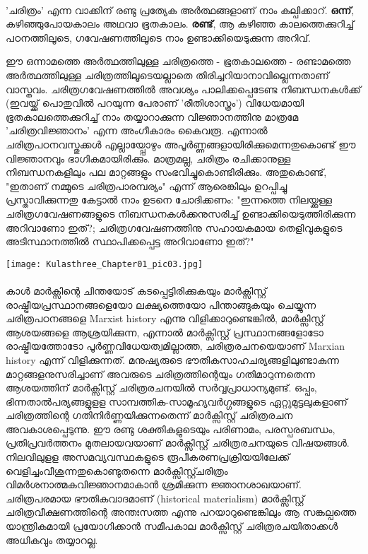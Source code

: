 \paragraph{}	'ചരിത്രം' എന്ന വാക്കിന് രണ്ടു പ്രത്യേക അർത്ഥങ്ങളാണ് നാം കല്പിക്കാറ്.
\noindent
\textbf{ഒന്ന്}, കഴിഞ്ഞുപോയകാലം അഥവാ ഭൂതകാലം.
\noindent
\textbf{രണ്ട്}, ആ കഴിഞ്ഞ കാലത്തെക്കുറിച്ച് പഠനത്തിലൂടെ, ഗവേഷണത്തിലൂടെ നാം ഉണ്ടാക്കിയെടുക്കുന്ന അറിവ്. 

	ഈ ഒന്നാമത്തെ അർത്ഥത്തിലുള്ള ചരിത്രത്തെ - ഭൂതകാലത്തെ - രണ്ടാമത്തെ അർത്ഥത്തിലുള്ള ചരിത്രത്തിലൂടെയല്ലാതെ തിരിച്ചറിയാനാവില്ലെന്നതാണ് വാസ്തവം. ചരിത്രഗവേഷണത്തിൽ അവശ്യം പാലിക്കപ്പെടേണ്ട നിബന്ധനകൾക്ക് (ഇവയ്ക്ക് പൊതുവിൽ പറയുന്ന പേരാണ് 'രീതിശാസ്ത്രം') വിധേയമായി ഭൂതകാലത്തെക്കുറിച്ച് നാം തയ്യാറാക്കുന്ന വിജ്ഞാനത്തിനു മാത്രമേ 'ചരിത്രവിജ്ഞാനം' എന്ന അംഗീകാരം കൈവരൂ. എന്നാൽ ചരിത്രപഠനവസ്തുക്കൾ എല്ലായ്പ്പോഴും അപൂർണ്ണങ്ങളായിരിക്കുമെന്നതുകൊണ്ട് ഈ വിജ്ഞാനവും ഭാഗികമായിരിക്കും. മാത്രമല്ല, ചരിത്രം രചിക്കാനുള്ള നിബന്ധനകളിലും പല മാറ്റങ്ങളും സംഭവിച്ചുകൊണ്ടിരിക്കും. അതുകൊണ്ട്, "ഇതാണ് നമ്മുടെ ചരിത്രപാരമ്പര്യം" എന്ന് ആരെങ്കിലും ഉറപ്പിച്ചു പ്രസ്താവിക്കുന്നതു കേട്ടാൽ നാം ഉടനെ ചോദിക്കണം: "ഇന്നത്തെ നിലയ്ക്കുള്ള ചരിത്രഗവേഷണങ്ങളുടെ നിബന്ധനകൾക്കനുസരിച്ച് ഉണ്ടാക്കിയെടുത്തിരിക്കുന്ന അറിവാണോ ഇത്?; ചരിത്രഗവേഷണത്തിനു സഹായകമായ തെളിവുകളുടെ അടിസ്ഥാനത്തിൽ സ്ഥാപിക്കപ്പെട്ട അറിവാണോ ഇത്?"

\begin{center}
\texttt{[image: Kulasthree\_Chapter01\_pic03.jpg]}
\end{center}

\label{ch1box2} %
\begin{tcolorbox}[%
  breakable, %
  arc=0mm, 
  left=1pt, right = 1pt, 
  boxrule=0mm,
  colback = {blue!10}, %
] 
{\paragraph{}കാൾ മാർക്സിന്റെ ചിന്തയോട് കടപ്പെട്ടിരിക്കുകയും മാർക്സിസ്റ്റ് രാഷ്ട്രീയപ്രസ്ഥാനങ്ങളെയോ ലക്ഷ്യത്തെയോ പിന്താങ്ങുകയും ചെയ്യുന്ന ചരിത്രപഠനങ്ങളെ Marxist history എന്നു വിളിക്കാറുണ്ടെങ്കിൽ, മാർക്സിസ്റ്റ് ആശയങ്ങളെ ആശ്രയിക്കുന്ന, എന്നാൽ മാർക്സിസ്റ്റ് പ്രസ്ഥാനങ്ങളോടോ രാഷ്ട്രീയത്തോടോ പൂർണ്ണവിധേയത്വമില്ലാത്ത, ചരിത്രരചനയെയാണ് Marxian history എന്ന് വിളിക്കുന്നത്. മനുഷ്യരുടെ ഭൗതികസാഹചര്യങ്ങളിലുണ്ടാകുന്ന മാറ്റങ്ങളനുസരിച്ചാണ് അവരുടെ ചരിത്രത്തിന്റെയും ഗതിമാറുന്നതെന്ന ആശയത്തിന് മാർക്സിസ്റ്റ് ചരിത്രരചനയിൽ സർവ്വപ്രാധാന്യമുണ്ട്. ഒപ്പം, ഭിന്നതാൽപര്യങ്ങളുളള സാമ്പത്തിക-സാമൂഹ്യവർഗ്ഗങ്ങളുടെ ഏറ്റുമുട്ടലുകളാണ് ചരിത്രത്തിന്റെ ഗതിനിർണ്ണയിക്കുന്നതെന്ന് മാർക്സിസ്റ്റ് ചരിത്രരചന അവകാശപ്പെടുന്നു. ഈ രണ്ടു ശക്തികളുടെയും പരിണാമം, പരസ്പരബന്ധം, പ്രതിപ്രവർത്തനം മുതലായവയാണ് മാർക്സിസ്റ്റ് ചരിത്രരചനയുടെ വിഷയങ്ങൾ. നിലവിലുളള അസമവ്യവസ്ഥകളുടെ രൂപീകരണപ്രക്രിയയിലേക്ക് വെളിച്ചംവീശുന്നതുകൊണ്ടുതന്നെ മാർക്സിസ്റ്റ്ചരിത്രം വിമർശനാത്മകവിജ്ഞാനമാകാൻ ശ്രമിക്കുന്ന ജ്ഞാനശാഖയാണ്. ചരിത്രപരമായ ഭൗതികവാദമാണ് (historical materialism) മാർക്സിസ്റ്റ് ചരിത്രവീക്ഷണത്തിന്റെ അന്തഃസത്ത എന്നു പറയാറുണ്ടെങ്കിലും ആ സങ്കല്പത്തെ യാന്ത്രികമായി പ്രയോഗിക്കാൻ സമീപകാല മാർക്സിസ്റ്റ് ചരിത്രരചയിതാക്കൾ അധികവും തയ്യാറല്ല.}
\end{tcolorbox}

